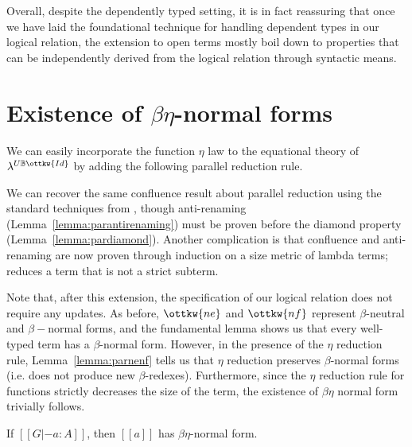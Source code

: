 \documentclass[acmsmall,screen=true,
\ifpublic review=false\else,review=true\fi
  ,anonymous=\ifanonymous true\else false\fi]{acmart}
\newcommand{\lang}{$\lambda^{U\mathbb{B}\ottkw{Id}}$\xspace}
\newcommand{\scw}[1]{}
\begin{document}
Overall, despite the dependently typed setting, it is in fact reassuring that
once we have laid the foundational technique for handling dependent types in
our logical relation, the extension to open terms mostly boil down to
properties that can be independently derived from the logical relation through
syntactic means.

\section{Existence of $\beta\eta$-normal forms}
\label{sec:betaeta}
\scw{Need an introduction to this section. Why do we care about this new
rule? What does this section demonstrate?}
\scw{The way we describe this
section should more clearly indicate that we have a mechanized version of this
proof. And include pointers on where readers might refer to it.}
We can easily incorporate the function $\eta$ law to the equational
theory of \lang{} by adding the following parallel reduction rule.
\begin{center}
\end{center}
We can recover the same confluence result about parallel reduction using the
standard techniques from \citet{barendregt:lambda-calculi-with-types,
  takahashi-parallel-reduction}, though anti-renaming
(Lemma~\ref{lemma:parantirenaming}) must be proven before the diamond property
(Lemma~\ref{lemma:pardiamond}). Another complication is that
confluence\scw{diamond property?} and anti-renaming are now proven through
induction on a size metric of lambda terms;  reduces a term
that is not a strict subterm.

Note that, after this extension, the specification of our logical relation does not require
any updates. As before, $\ottkw{ne}$ and $\ottkw{nf}$
represent $\beta$-neutral and $\beta-$normal forms, and the
fundamental lemma shows us that every well-typed term has a
$\beta$-normal form. However, in the presence of the $\eta$ reduction
rule, Lemma~\ref{lemma:parnenf} tells us that $\eta$ reduction
preserves $\beta$-normal forms (i.e. does not produce new
$\beta$-redexes). Furthermore, since the $\eta$ reduction rule for
functions strictly decreases the size of the term, the existence of
$\beta\eta$ normal form trivially follows.
\begin{corollary}
\label{corollary:exbetaeta}
If $[[G |- a : A]]$, then $[[a]]$ has $\beta\eta$-normal form.
\end{corollary}
\end{document}
